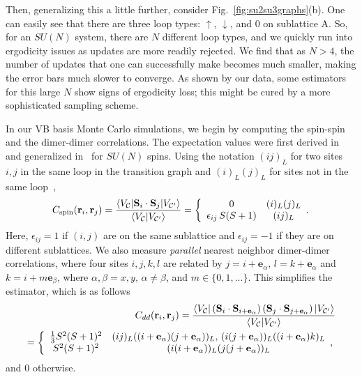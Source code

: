 \documentclass[11pt]{iopart}
\begin{document}
%
Then, generalizing this a little further, consider Fig.~\ref{fig:su2su3graphs}(b).
One can easily see that there are three loop types: $\uparrow$, $\downarrow$, and 0 on sublattice A.
So, for an $SU(N)$ system, there are $N$ different loop types, and we quickly run into ergodicity issues as updates are more readily rejected.
We find that as $N>4$, the number of updates that one can successfully make becomes much smaller, making the error bars much slower to converge.
As shown by our data, some estimators for this large $N$ show signs of ergodicity loss; this might be cured by a more sophisticated sampling scheme.



In our VB basis Monte Carlo simulations, we begin by computing the spin-spin and the dimer-dimer correlations. The expectation values were first derived in~\cite{beach2006some} and generalized in~\cite{beach2009n} for $SU(N)$ spins.  Using the notation $(ij)_L$ for two sites $i,j$ in the same loop in the transition graph and $(i)_L(j)_L$ for sites not in the same loop~\cite{RVB2},
%
\begin{equation}
	C_{\rm spin}({\bf r}_i, {\bf r}_j) 
		= \frac{\langle V_\mathcal{C} | \mathbf{S}_i \cdot \mathbf{S}_j | V_{\mathcal{C}'} \rangle}
			{\langle V_\mathcal{C} | V_{\mathcal{C}'} \rangle}
		 = \left\{ \begin{array}{ccc}
			0 & (i)_L (j)_L\\
			\epsilon_{ij} \, S (S+1) & (ij)_L   \end{array}. \right.
\end{equation}
%
Here, $\epsilon_{ij} = 1$ if $(i,j)$ are on the same sublattice and $\epsilon_{ij} = -1$ if they are on different sublattices.
%
We also measure \textit{parallel} nearest neighbor dimer-dimer correlations, where four sites $i,j,k,l$ are related by $j = i + \mathbf{e}_\alpha, \, l = k + \mathbf{e}_\alpha$ and $k = i + m \mathbf{e}_\beta$, where $\alpha,\beta = x, y, \, \alpha \neq \beta$, and $m \in \{0,1,...\}$.
%
This simplifies the estimator, which is as follows
%
\begin{eqnarray}
	C_{dd}({\bf r}_i, {\bf r}_j)  = 
			\frac{\langle V_\mathcal{C} | \left( \mathbf{S}_i \cdot \mathbf{S}_{i+\mathbf{e}_\alpha} \right) \left( \mathbf{S}_j \cdot \mathbf{S}_{j+\mathbf{e}_\alpha}  \right) 
					| V_{\mathcal{C}'} \rangle}{\langle V_\mathcal{C} | V_{\mathcal{C}'} \rangle} \\
					 = \left\{ \begin{array}{ccc}
				\frac{1}{3} S^2 (S+1)^2 & (ij)_L ((i+\mathbf{e}_\alpha)(j+\mathbf{e}_\alpha))_L, \,(i(j+\mathbf{e}_\alpha))_L ((i+\mathbf{e}_\alpha)k)_L\\
		S^2 (S+1)^2 & (i(i+\mathbf{e}_\alpha))_L (j(j+\mathbf{e}_\alpha))_L \end{array}, \right.
\end{eqnarray}
%
and $0$ otherwise.
\end{document}
